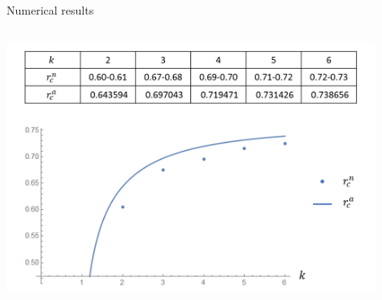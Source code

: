 \documentclass{fdubeamer}
\begin{document}
\begin{frame}{Numerical results}
\begin{columns}[T]
    \centering
    \includegraphics[width=0.9\textwidth]{images/holographic/a-k+1-coupling.png}

\end{columns}


\end{frame}
\end{document}
